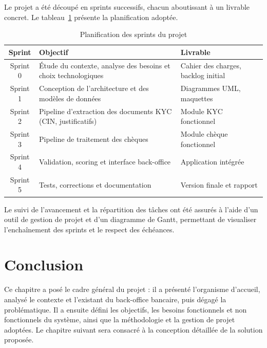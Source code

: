 Le projet a été découpé en sprints successifs, chacun aboutissant à un
livrable concret. Le tableau~\ref{tab:sprints} présente la planification
adoptée.

\begin{table}[H]
\centering
\label{tab:sprints}
\begin{tabular}{|c|p{6.0cm}|p{5.0cm}|}
\hline
\textbf{Sprint} & \textbf{Objectif} & \textbf{Livrable} \\
\hline
Sprint 0 & Étude du contexte, analyse des besoins et choix technologiques & Cahier des charges, backlog initial \\
\hline
Sprint 1 & Conception de l'architecture et des modèles de données & Diagrammes UML, maquettes \\
\hline
Sprint 2 & Pipeline d'extraction des documents KYC (CIN, justificatifs) & Module KYC fonctionnel \\
\hline
Sprint 3 & Pipeline de traitement des chèques & Module chèque fonctionnel \\
\hline
Sprint 4 & Validation, scoring et interface back-office & Application intégrée \\
\hline
Sprint 5 & Tests, corrections et documentation & Version finale et rapport \\
\hline
\end{tabular}
\caption{Planification des sprints du projet}
\end{table}

Le suivi de l'avancement et la répartition des tâches ont été assurés à
l'aide d'un outil de gestion de projet et d'un diagramme de Gantt, permettant
de visualiser l'enchaînement des sprints et le respect des échéances.


\clearpage

\section*{Conclusion}

Ce chapitre a posé le cadre général du projet : il a présenté l'organisme
d'accueil, analysé le contexte et l'existant du back-office bancaire, puis
dégagé la problématique. Il a ensuite défini les objectifs, les besoins
fonctionnels et non fonctionnels du système, ainsi que la méthodologie et la
gestion de projet adoptées. Le chapitre suivant sera consacré à la conception
détaillée de la solution proposée.

